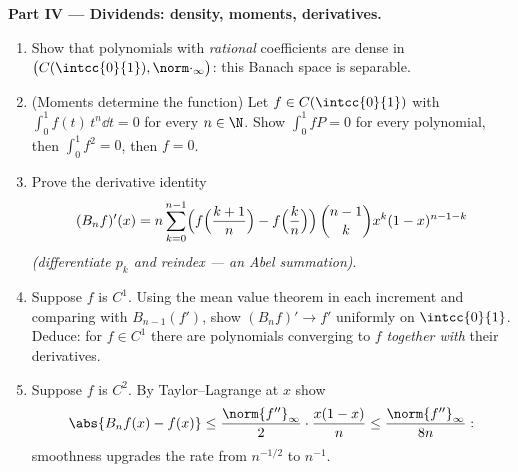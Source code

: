 \begin{problem}
\medskip
\noindent\textbf{Part IV --- Dividends: density, moments,
derivatives.}
\begin{enumerate}[resume]
  \item Show that polynomials with \emph{rational} coefficients
        are dense in $\bigl(C(\intcc{0}{1}),
        \norm\cdot_\infty\bigr)$: this Banach space is
        separable.
  \item (Moments determine the function) Let $f \in
        C(\intcc{0}{1})$ with $\int_0^1 f(t)\,t^n \dd t = 0$
        for every $n \in \N$. Show $\int_0^1 f P = 0$ for every
        polynomial, then $\int_0^1 f^2 = 0$, then $f = 0$.
  \item Prove the derivative identity
        \[
        (B_nf)'(x) = n\sum_{k=0}^{n-1}\Bigl(
        f\Bigl(\frac{k+1}{n}\Bigr) -
        f\Bigl(\frac kn\Bigr)\Bigr)\,
        \binom{n-1}{k}x^k(1-x)^{n-1-k}
        \]
        \emph{(differentiate $p_k$ and reindex --- an Abel
        summation)}.
  \item Suppose $f$ is $C^1$. Using the mean value theorem in
        each increment and comparing with $B_{n-1}(f')$, show
        $(B_nf)' \to f'$ uniformly on $\intcc{0}{1}$. Deduce:
        for $f \in C^1$ there are polynomials converging to $f$
        \emph{together with} their derivatives.
  \item Suppose $f$ is $C^2$. By Taylor--Lagrange at $x$ show
        \[
        \abs{B_nf(x) - f(x)} \leq
        \frac{\norm{f''}_\infty}{2}\cdot\frac{x(1-x)}{n}
        \leq \frac{\norm{f''}_\infty}{8n} :
        \]
        smoothness upgrades the rate from $n^{-1/2}$ to
        $n^{-1}$.
\end{enumerate}


\end{problem}
